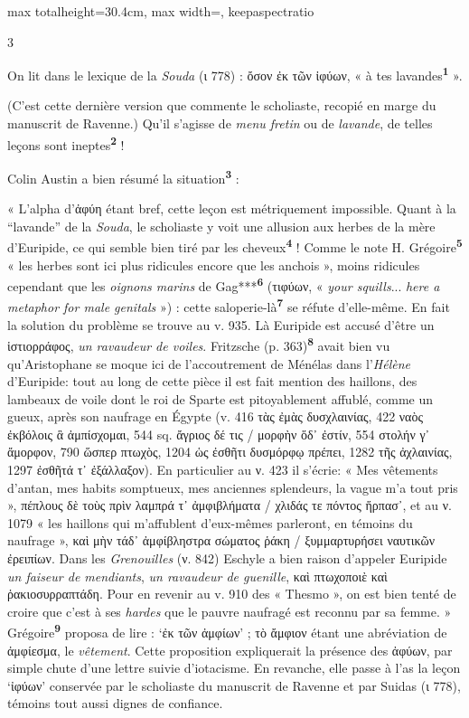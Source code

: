 \documentclass[11pt,twoside]{book}
\newcommand{\italique}[1]{\textit{#1}}
\newcommand{\anglais}[1]{\textit{#1}}
\newcommand{\marqueur}[1]{\textsuperscript{\color{rubricRed}\textbf{#1}}}
\begin{document}
\begin{adjustbox}{max totalheight=30.4cm, max width=\textwidth, keepaspectratio}
\begin{minipage}{\textwidth}
{\begin{multicols}{3}
\par\vspace{1.5pt}
\noindent On lit dans le lexique de la \italique{Souda} (ι 778) : ὄσον ἐκ τῶν ἰφύων, « à tes lavandes\marqueur{1} ».
\par\vspace{1.5pt}
\noindent (C'est cette dernière version que commente le scholiaste, recopié en marge du manuscrit de Ravenne.) Qu'il s'agisse de \italique{menu fretin} ou de \italique{lavande}, de telles leçons sont ineptes\marqueur{2} !
\par\vspace{1.5pt}
\noindent Colin Austin a bien résumé la situation\marqueur{3} :
\par\vspace{1.5pt}
\noindent « L'alpha d'ἀφύη étant bref, cette leçon est métriquement impossible. Quant à la ``lavande'' de la \italique{Souda}, le scholiaste y voit une allusion aux herbes de la mère d'Euripide, ce qui semble bien tiré par les cheveux\marqueur{4} ! Comme le note H. Grégoire\marqueur{5} « les herbes sont ici plus ridicules encore que les anchois », moins ridicules cependant que les \italique{oignons marins} de Gag***\marqueur{6} (τιφύων, « \italique{your squills}... \anglais{here a metaphor for male genitals} ») : cette saloperie-là\marqueur{7} se réfute d'elle-même. En fait la solution du problème se trouve au v. 935. Là Euripide est accusé d'être un ἱστιορράφος, \italique{un ravaudeur de voiles}. Fritzsche (p. 363)\marqueur{8} avait bien vu qu'Aristophane se moque ici de l'accoutrement de Ménélas dans l'\italique{Hélène} d'Euripide: tout au long de cette pièce il est fait mention des haillons, des lambeaux de voile dont le roi de Sparte est pitoyablement affublé, comme un gueux, après son naufrage en Égypte (v. 416 τὰς ἐμὰς δυσχλαινίας, 422 ναὸς ἐκβόλοις ἃ ἀμπίσχομαι, 544 sq. ἄγριος δέ τις / μορφὴν ὅδ᾽ ἐστίν, 554 στολήν γ᾽ ἄμορφον, 790 ὥσπερ πτωχὸς, 1204 ὡς ἐσθῆτι δυσμόρφῳ πρέπει, 1282 τῆς ἀχλαινίας, 1297 ἐσθῆτά τ᾽ ἐξάλλαξον). En particulier au ν. 423 il s'écrie: « Mes vêtements d'antan, mes habits somptueux, mes anciennes splendeurs, la vague m'a tout pris », πέπλους δὲ τοὺς πρὶν λαμπρά τ᾽ ἀμφιβλήματα / χλιδάς τε πόντος ἥρπασ᾽, et au ν. 1079 « les haillons qui m'affublent d'eux-mêmes parleront, en témoins du naufrage », καὶ μὴν τάδ᾽ ἀμφίβληστρα σώματος ῥάκη / ξυμμαρτυρήσει ναυτικῶν ἐρειπίων. Dans les \italique{Grenouilles} (ν. 842) Eschyle a bien raison d'appeler Euripide \italique{un faiseur de mendiants}, \italique{un ravaudeur de guenille}, καὶ πτωχοποιὲ καὶ ῥακιοσυρραπτάδη. Pour en revenir au v. 910 des « Thesmo », on est bien tenté de croire que c'est à ses \italique{hardes} que le pauvre naufragé est reconnu par sa femme. »\\  Grégoire\marqueur{9} proposa de lire : `ἐκ τῶν ἀμφίων' ; τὸ ἄμφιον étant une abréviation de ἀμφίεσμα, le \italique{vêtement}. Cette proposition expliquerait la présence des ἀφύων, par simple chute d'une lettre suivie d'iotacisme. En revanche, elle passe à l'as la leçon `ἰφύων' conservée par le scholiaste du manuscrit de Ravenne et par Suidas (ι 778), témoins tout aussi dignes de confiance.

\end{multicols}}
\end{minipage}
\end{adjustbox}
\end{document}
